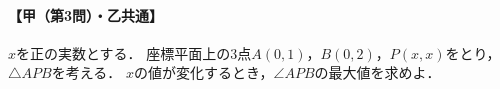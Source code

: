 \documentclass[../../main.tex]{subfiles}
\begin{document}
\paragraph{【甲（第3問）・乙共通】}
$x$を正の実数とする．
座標平面上の3点$A(0,1)$，$B(0,2)$，$P(x,x)$をとり，$\triangle APB$を考える．
$x$の値が変化するとき，$\angle APB$の最大値を求めよ．
\end{document}

